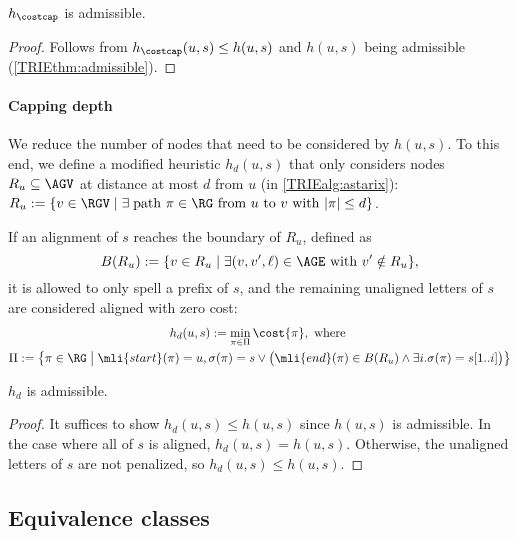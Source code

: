 \begin{samepage}
	\begin{thm} \label{TRIEthm:hcostcap_admissible}
		$h_{\costcap}$ is admissible.
	\end{thm}
	\begin{proof}
		Follows from $h_\costcap(u,s) \leq h(u,s)$ and $h(u,s)$ being admissible
		(\cref{TRIEthm:admissible}).
	\end{proof}
	\end{samepage}

\paragraph{Capping depth}
We reduce the number of nodes that need to be considered by $h(u,s)$. To this
end, we define a modified heuristic $h_d(u,s)$ that only considers nodes $R_u
\subseteq \AGV$ at distance at most $d$ from $u$ (in \cref{TRIEalg:astarix}):
$
R_u := \{ v \in \RGV \mid \exists \; \text{path } \pi \in \RG \text{ from } u \text{ to } v \text{ with } \lvert \pi \rvert \leq d \}
$.

If an alignment of $s$ reaches the boundary of $R_u$, defined as $$B(R_u) := \{v
\in R_u \mid \exists (v,v',\ell) \in \AGE \text{ with } v' \notin R_u \},$$ it is
allowed to only spell a prefix of $s$, and the remaining unaligned letters of
$s$ are considered aligned with zero cost:
\begin{gather*}
h_d(u,s) := \min_{\pi \in \Pi} \cost{\pi}, \text{ where } \\
\Pi := \left\{ \pi \in \RG \;\middle|\;
\mli{start}(\pi)=u, 
\sigma(\pi)=s \lor \big(\mli{end}(\pi)\in B(R_u) \land \exists i. \sigma(\pi)=s[1..i] \big)
\right\}
\end{gather*}

\begin{samepage}
\begin{thm} \label{TRIEthm:hbar_admissible}
	$h_d$ is admissible.
\end{thm}
\begin{proof}
	It suffices to show $h_d(u,s) \leq h(u, s)$ since $h(u, s)$ is admissible.
	In the case where all of $s$ is aligned, $h_d(u,s) = h(u, s)$. Otherwise,
	the unaligned letters of $s$ are not penalized, so $h_d(u,s) \leq h(u, s)$.
\end{proof}
\end{samepage}


\subsection{Equivalence classes} \label{TRIEsubsec:partition}

